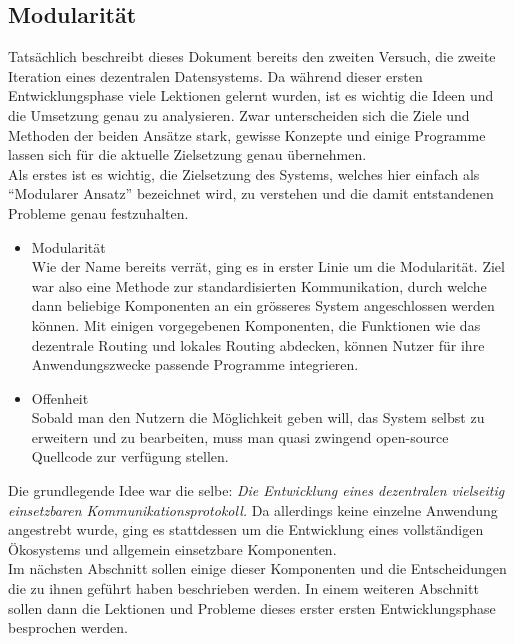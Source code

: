 \documentclass[11pt]{article}
\begin{document}
\subsection{Modularität}
\label{sec:orgd9927fd}
Tatsächlich beschreibt dieses Dokument bereits den zweiten Versuch,
die zweite Iteration eines dezentralen Datensystems. Da während dieser
ersten Entwicklungsphase viele Lektionen gelernt wurden, ist es
wichtig die Ideen und die Umsetzung genau zu analysieren. Zwar
unterscheiden sich die Ziele und Methoden der beiden Ansätze stark,
gewisse Konzepte und einige Programme lassen sich für die aktuelle
Zielsetzung genau übernehmen.\\

\noindent Als erstes ist es wichtig, die Zielsetzung des Systems,
welches hier einfach als “Modularer Ansatz” bezeichnet wird, zu
verstehen und die damit entstandenen Probleme genau festzuhalten.
\begin{itemize}
\item Modularität \\
Wie der Name bereits verrät, ging es in erster Linie um die
Modularität. Ziel war also eine Methode zur standardisierten
Kommunikation, durch welche dann beliebige Komponenten an ein
grösseres System angeschlossen werden können. Mit einigen
vorgegebenen Komponenten, die Funktionen wie das dezentrale Routing
und lokales Routing abdecken, können Nutzer für ihre
Anwendungszwecke passende Programme integrieren.
\item Offenheit \\
Sobald man den Nutzern die Möglichkeit geben will, das System selbst
zu erweitern und zu bearbeiten, muss man quasi zwingend open-source
Quellcode zur verfügung stellen.
\end{itemize}

\noindent Die grundlegende Idee war die selbe: \emph{Die Entwicklung eines
dezentralen vielseitig einsetzbaren Kommunikationsprotokoll.} Da
allerdings keine einzelne Anwendung angestrebt wurde, ging es
stattdessen um die Entwicklung eines vollständigen Ökosystems und
allgemein einsetzbare Komponenten.\\

\noindent Im nächsten Abschnitt sollen einige dieser Komponenten und
die Entscheidungen die zu ihnen geführt haben beschrieben werden. In
einem weiteren Abschnitt sollen dann die Lektionen und Probleme dieses
erster ersten Entwicklungsphase besprochen werden. 
\end{document}
